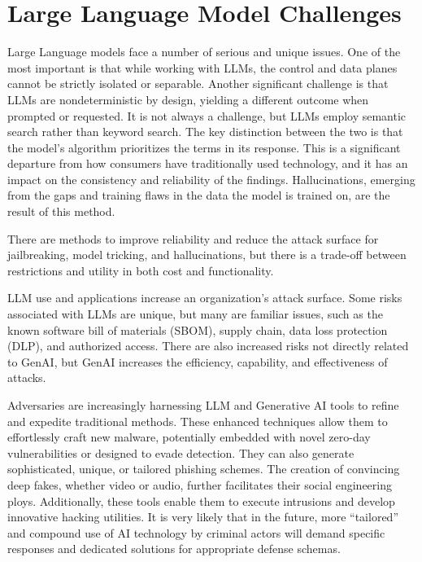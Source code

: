 \headerimage
\chapter{Large Language Model Challenges}
Large Language models face a number of serious and unique issues. One of the
most important is that while working with LLMs, the control and data planes
cannot be strictly isolated or separable. Another significant challenge is
that LLMs are nondeterministic by design, yielding a different outcome when
prompted or requested. It is not always a challenge, but LLMs employ semantic
search rather than keyword search. The key distinction between the two is that
the model's algorithm prioritizes the terms in its response. This is a
significant departure from how consumers have traditionally used technology,
and it has an impact on the consistency and reliability of the findings.
Hallucinations, emerging from the gaps and training flaws in the data the model
is trained on, are the result of this method.

There are methods to improve reliability and reduce the attack surface for
jailbreaking, model tricking, and hallucinations, but there is a trade-off
between restrictions and utility in both cost and functionality.

LLM use and applications increase an organization's attack surface. Some risks
associated with LLMs are unique, but many are familiar issues, such as the
known software bill of materials (SBOM), supply chain, data loss protection
(DLP), and authorized access. There are also increased risks not directly
related to GenAI, but GenAI increases the efficiency, capability, and
effectiveness of attacks.

Adversaries are increasingly harnessing LLM and Generative AI tools to refine
and expedite traditional methods. These enhanced techniques allow them to
effortlessly craft new malware, potentially embedded with novel zero-day
vulnerabilities or designed to evade detection. They can also generate
sophisticated, unique, or tailored phishing schemes. The creation of convincing
deep fakes, whether video or audio, further facilitates their social
engineering ploys. Additionally, these tools enable them to execute intrusions
and develop innovative hacking utilities. It is very likely that in the future,
more “tailored” and compound use of AI technology by criminal actors will demand
specific responses and dedicated solutions for appropriate defense schemas.

